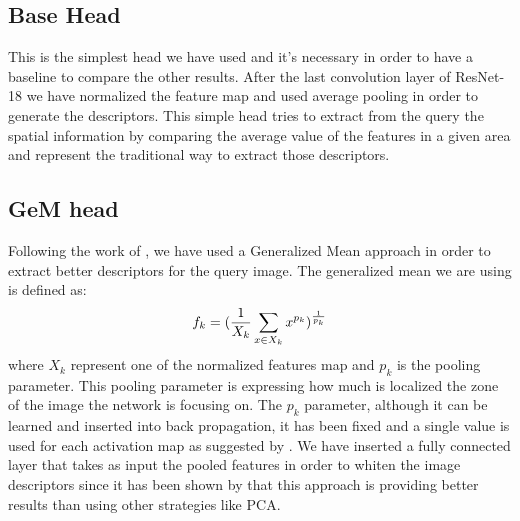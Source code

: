 \documentclass[10pt,twocolumn,letterpaper]{article}
\begin{document}
\subsection{Base Head}
This is the simplest head we have used and it's necessary in order to have a baseline to compare the other
results. After the last convolution layer of ResNet-18 we have normalized the feature map and used average 
pooling in order to generate the descriptors. This simple head tries to extract from the query the spatial
information by comparing the average value of the features in a given area and represent the traditional way 
to extract those descriptors.

\subsection{GeM head}
Following the work of \cite{GEM}, we have used a Generalized Mean approach in order to extract better 
descriptors for the query image. The generalized mean we are using is defined as:
\begin{equation}
   f_k = ({{1}\over{X_k}} \sum_{x \in X_k} x^{p_k} ) ^ {1\over{p_k}}
\end{equation}
where $X_k $ represent one of the normalized features map and $p_k $ is the pooling parameter. This 
pooling parameter is expressing how much is localized the zone of the image the network is focusing on.
The $p_k $ parameter, although it can be learned and inserted into back propagation, it has been fixed
and a single value is used for each activation map as suggested by \cite{GEM}. We have
inserted a fully connected layer that takes as input the pooled features in order to whiten the image
descriptors since it has been shown by \cite{GEM} that this approach is providing better results than
using other strategies like PCA.
\end{document}
